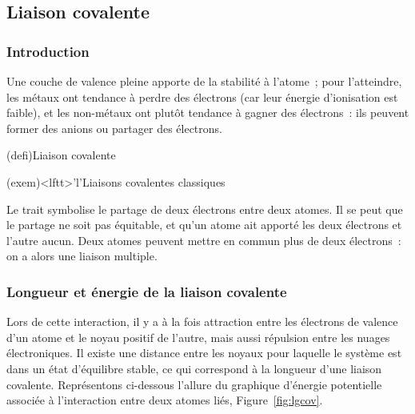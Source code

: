 \documentclass[../../main/main.tex]{subfiles}
\begin{document}
\subsection{Liaison covalente}
\subsubsection{Introduction}
Une couche de valence pleine apporte de la stabilité à l'atome~; pour
l'atteindre, les métaux ont tendance à perdre des électrons (car leur énergie
d'ionisation est faible), et les non-métaux ont plutôt tendance à gagner des
électrons~: ils peuvent former des anions ou partager des électrons.

\begin{tcb*}(defi){Liaison covalente}
\end{tcb*}

\begin{tcb*}(exem)<lftt>'l'{Liaisons covalentes classiques}
	\vspace{-12pt}
	\vspace{-30pt}
\end{tcb*}

Le trait symbolise le partage de deux électrons entre deux atomes. Il se peut
que le partage ne soit pas équitable, et qu'un atome ait apporté les deux
électrons et l'autre aucun. Deux atomes peuvent mettre en commun plus de deux
électrons~: on a alors une liaison multiple.

\subsubsection{Longueur et énergie de la liaison covalente}

Lors de cette interaction, il y a à la fois attraction entre les électrons de
valence d'un atome et le noyau positif de l'autre, mais aussi répulsion entre
les nuages électroniques. Il existe une distance entre les noyaux pour laquelle
le système est dans un état d'équilibre stable, ce qui correspond à la longueur
d'une liaison covalente. Représentons ci-dessous l'allure du graphique d'énergie
potentielle associée à l'interaction entre deux atomes liés,
Figure~\ref{fig:lgcov}.
\end{document}

